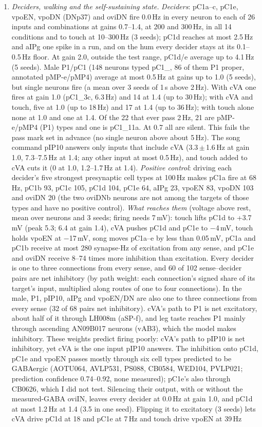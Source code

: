 \documentclass[11pt,a4paper]{article}
\begin{document}
\begin{enumerate}[leftmargin=*, label=\arabic*., itemsep=4pt]
\item \emph{Deciders, walking and the self-sustaining state.} \emph{Deciders}: pC1a--c, pC1e, vpoEN, vpoDN (DNp37) and oviDN fire 0.0\,Hz in every neuron to each of 26 inputs and combinations at gains 0.7--1.4, at 200 and 300\,Hz, in all 14 conditions and to touch at 10--300\,Hz (3 seeds); pC1d reaches at most 2.5\,Hz and aIPg one spike in a run, and on the hum every decider stays at its 0.1--0.5\,Hz floor. At gain 2.0, outside the test range, pC1d/e average up to 4.1\,Hz (5 seeds). Male P1/pC1 (148 neurons typed pC1\_, 86 of them P1 proper, annotated pMP-e/pMP4) average at most 0.5\,Hz at gains up to 1.0 (5 seeds), but single neurons fire (a mean over 3 seeds of 1\,s above 2\,Hz). With cVA one fires at gain 1.0 (pC1\_3c, 6.3\,Hz) and 14 at 1.4 (up to 30\,Hz); with cVA and touch, five at 1.0 (up to 18\,Hz) and 17 at 1.4 (up to 36\,Hz); with touch alone none at 1.0 and one at 1.4. Of the 22 that ever pass 2\,Hz, 21 are pMP-e/pMP4 (P1) types and one is pC1\_11a. At 0.7 all are silent. This fails the pass mark set in advance (no single neuron above about 5\,Hz). The song command pIP10 answers only inputs that include cVA (3.3\,$\pm$\,1.6\,Hz at gain 1.0, 7.3--7.5\,Hz at 1.4; any other input at most 0.5\,Hz), and touch added to cVA cuts it (0 at 1.0, 1.2--1.7\,Hz at 1.4). \emph{Positive control}: driving each decider's five strongest presynaptic cell types at 100\,Hz makes pC1a fire at 68\,Hz, pC1b 93, pC1c 105, pC1d 104, pC1e 64, aIPg 23, vpoEN 83, vpoDN 103 and oviDN 20 (the two oviDNb neurons are not among the targets of those types and have no positive control). \emph{What reaches them} (voltage above rest, mean over neurons and 3 seeds; firing needs 7\,mV): touch lifts pC1d to +3.7\,mV (peak 5.3; 6.4 at gain 1.4), cVA pushes pC1d and pC1e to $-$4\,mV, touch holds vpoEN at $-$17\,mV, song moves pC1a--e by less than 0.05\,mV, pC1a and pC1b receive at most 280 synapse$\cdot$Hz of excitation from any sense, and pC1e and oviDN receive 8--74 times more inhibition than excitation. Every decider is one to three connections from every sense, and 60 of 102 sense--decider pairs are net inhibitory (by path weight: each connection's signed share of its target's input, multiplied along routes of one to four connections). In the male, P1, pIP10, aIPg and vpoEN/DN are also one to three connections from every sense (32 of 68 pairs net inhibitory). cVA's path to P1 is net excitatory, about half of it through LH008m (aSP-f), and leg taste reaches P1 mainly through ascending AN09B017 neurons (vAB3), which the model makes inhibitory. These weights predict firing poorly: cVA's path to pIP10 is net inhibitory, yet cVA is the one input pIP10 answers. The inhibition onto pC1d, pC1e and vpoEN passes mostly through six cell types predicted to be GABAergic (AOTU064, AVLP531, PS088, CB0584, WED104, PVLP021; prediction confidence 0.74--0.92, none measured); pC1e's also through CB0626, which I did not test. Silencing their output, with or without the measured-GABA oviIN, leaves every decider at 0.0\,Hz at gain 1.0, and pC1d at most 1.2\,Hz at 1.4 (3.5 in one seed). Flipping it to excitatory (3 seeds) lets cVA drive pC1d at 18 and pC1e at 7\,Hz and touch drive vpoEN at 39\,Hz 
\end{enumerate}
\end{document}
